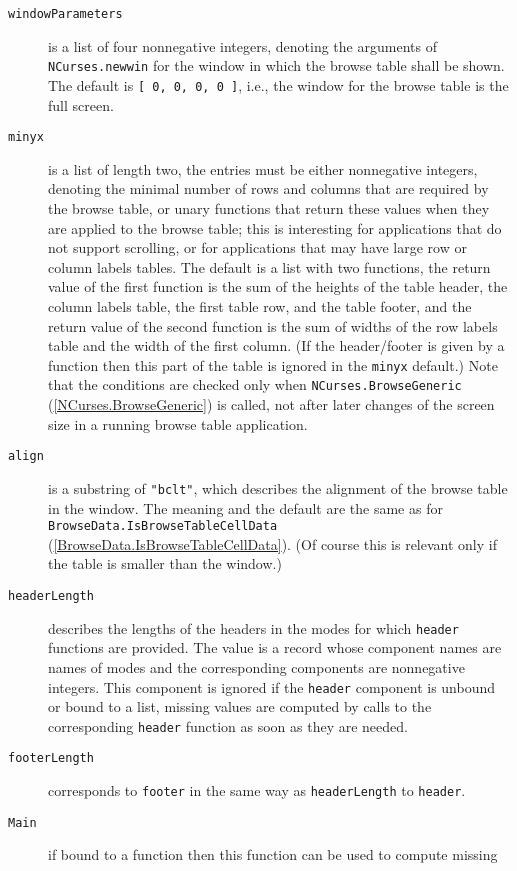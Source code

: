 \documentclass[a4paper,11pt]{report}
\begin{document}
{{{ 
\begin{description}
\item[{\texttt{windowParameters}}]  is a list of four nonnegative integers, denoting the arguments of \texttt{NCurses.newwin} for the window in which the browse table shall be shown. The default is \texttt{[ 0, 0, 0, 0 ]}, i.{\nobreakspace}e., the window for the browse table is the full screen. 
\item[{\texttt{minyx}}]  is a list of length two, the entries must be either nonnegative integers,
denoting the minimal number of rows and columns that are required by the
browse table, or unary functions that return these values when they are
applied to the browse table; this is interesting for applications that do not
support scrolling, or for applications that may have large row or column
labels tables. The default is a list with two functions, the return value of
the first function is the sum of the heights of the table header, the column
labels table, the first table row, and the table footer, and the return value
of the second function is the sum of widths of the row labels table and the
width of the first column. (If the header/footer is given by a function then
this part of the table is ignored in the \texttt{minyx} default.) Note that the conditions are checked only when \texttt{NCurses.BrowseGeneric} (\ref{NCurses.BrowseGeneric}) is called, not after later changes of the screen size in a running browse
table application. 
\item[{\texttt{align}}]  is a substring of \texttt{"bclt"}, which describes the alignment of the browse table in the window. The meaning
and the default are the same as for \texttt{BrowseData.IsBrowseTableCellData} (\ref{BrowseData.IsBrowseTableCellData}). (Of course this is relevant only if the table is smaller than the window.) 
\item[{\texttt{headerLength}}]  describes the lengths of the headers in the modes for which \texttt{header} functions are provided. The value is a record whose component names are names
of modes and the corresponding components are nonnegative integers. This
component is ignored if the \texttt{header} component is unbound or bound to a list, missing values are computed by calls
to the corresponding \texttt{header} function as soon as they are needed. 
\item[{\texttt{footerLength}}]  corresponds to \texttt{footer} in the same way as \texttt{headerLength} to \texttt{header}. 
\item[{\texttt{Main}}]  if bound to a function then this function can be used to compute missing

\end{description}}}}
\end{document}
